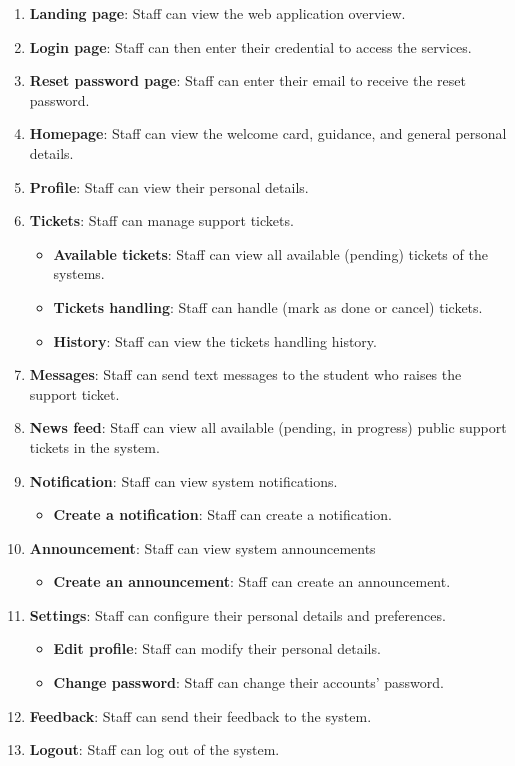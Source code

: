 	\begin{enumerate}
		\item \textbf{Landing page}: Staff can view the web application overview.
		\item \textbf{Login page}: Staff can then enter their credential to access the services.
		\item \textbf{Reset password page}: Staff can enter their email to receive the reset password.
		\item \textbf{Homepage}: Staff can view the welcome card, guidance, and general personal details.
		\item \textbf{Profile}: Staff can view their personal details.
		\item \textbf{Tickets}: Staff can manage support tickets.
		\begin{itemize}
			\item \textbf{Available tickets}: Staff can view all available (pending) tickets of the systems.
			\item \textbf{Tickets handling}: Staff can handle (mark as done or cancel) tickets.
			\item \textbf{History}: Staff can view the tickets handling history.
		\end{itemize}
		\item \textbf{Messages}: Staff can send text messages to the student who raises the support ticket.
		\item \textbf{News feed}: Staff can view all available (pending, in progress) public support tickets in the system.
		\item \textbf{Notification}: Staff can view system notifications.
			\begin{itemize}
				\item \textbf{Create a notification}: Staff can create a notification.
			\end{itemize}
		\item \textbf{Announcement}: Staff can view system announcements
			\begin{itemize}
				\item \textbf{Create an announcement}: Staff can create an announcement.
			\end{itemize}
		\item \textbf{Settings}: Staff can configure their personal details and preferences.
		\begin{itemize}
			\item \textbf{Edit profile}: Staff can modify their personal details.
			\item \textbf{Change password}: Staff can change their accounts' password.
		\end{itemize}
		\item \textbf{Feedback}: Staff can send their feedback to the system.
		\item \textbf{Logout}: Staff can log out of the system.
	\end{enumerate}
	
